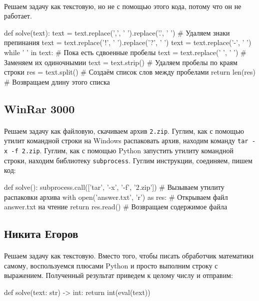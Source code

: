 \documentclass[12pt]{article}
\begin{document}
    \paragraph{}
    Решаем задачу как текстовую, но не с помощью этого кода, потому что он не работает.
    \begin{pythoncode}
def solve(text):
    text = text.replace(',', ' ').replace('.', ' ')  # Удаляем знаки препинания
    text = text.replace('!', ' ').replace('?', ' ')
    text = text.replace('-', ' ')
    while '  ' in text:                              # Пока есть сдвоенные пробелы
        text = text.replace('  ', ' ')               # Заменяем их одиночнымии
    text = text.strip()                              # Удаляем пробелы по краям строки
    res = text.split()                               # Создаём список слов между пробелами
    return len(res)                                  # Возвращаем длину этого списка
    \end{pythoncode}

    \subsection{WinRar 3000}
    \paragraph{}
    Решаем задачу как файловую, скачиваем архив \verb|2.zip|.
    Гуглим, как с помощью утилит командной строки на Windows распаковать архив, находим команду \verb|tar -x -f 2.zip|.
    Гуглим, как с помощью Python запустить утилиту командной строки, находим библиотеку \verb|subprocess|.
    Гуглим инструкции, соединяем, пишем код:
    \begin{pythoncode}
def solve():
    subprocess.call(['tar',  '-x', '-f',  '2.zip']) # Вызываем утилиту распаковки архива
    with open('answer.txt', 'r') as res:            # Открываем файл answer.txt на чтение
        return res.read()                           # Возвращаем содержимое файла
    \end{pythoncode}

    \subsection{Никита Егоров}
    \paragraph{}
    Решаем задачу как текстовую.
    Вместо того, чтобы писать обработчик математики самому, воспользуемся плюсами Python и просто выполним
    строку с выражением.
    Полученный результат приведем к целому числу и отправим:
    \begin{pythoncode}
def solve(text: str) -> int:
    return int(eval(text))
    \end{pythoncode}
\end{document}
